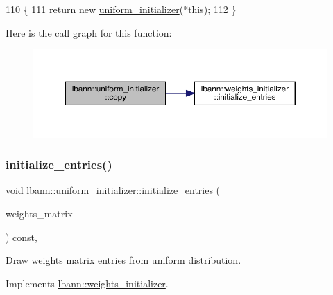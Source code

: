 \begin{DoxyCode}
110                                              \{
111     \textcolor{keywordflow}{return} \textcolor{keyword}{new} \hyperlink{classlbann_1_1uniform__initializer_a97376dcd91f5dfe1d6f2a6aea2c328e4}{uniform\_initializer}(*\textcolor{keyword}{this});
112   \}
\end{DoxyCode}
Here is the call graph for this function\+:\nopagebreak
\begin{figure}[H]
\begin{center}
\leavevmode
\includegraphics[width=350pt]{classlbann_1_1uniform__initializer_aeff019b94438eeb847d7236d5d28cdb3_cgraph}
\end{center}
\end{figure}
\mbox{\label{classlbann_1_1uniform__initializer_a23461a8ab897f0aeafc524a61cb0f4eb}} 
\subsubsection{\texorpdfstring{initialize\+\_\+entries()}{initialize\_entries()}}
{\footnotesize\ttfamily void lbann\+::uniform\+\_\+initializer\+::initialize\+\_\+entries (\begin{DoxyParamCaption}\item[{\hyperlink{base_8hpp_a9a697a504ae84010e7439ffec862b470}{Abs\+Dist\+Mat} \&}]{weights\+\_\+matrix }\end{DoxyParamCaption}) const\hspace{0.3cm}{\ttfamily [override]}, {\ttfamily [virtual]}}

Draw weights matrix entries from uniform distribution. 

Implements \hyperlink{classlbann_1_1weights__initializer_a2ad6acf904c0c7bc7406dbd9851107be}{lbann\+::weights\+\_\+initializer}.



